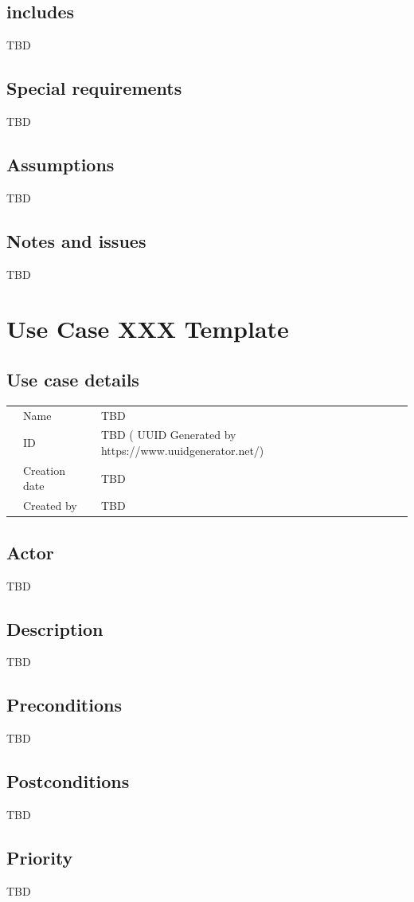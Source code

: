 \documentclass[a4paper]{article}
\begin{document}
\subsection{includes}
TBD
\subsection{Special requirements}
TBD
\subsection{Assumptions}
TBD
\subsection{Notes and issues}
TBD

\section{Use Case XXX Template}
\subsection{Use case details}

\begin{tabular}{lll}
	&Name  & TBD \\
	&ID  & TBD ( UUID Generated by https://www.uuidgenerator.net/) \\
	&Creation date  & TBD \\
	&Created by  & TBD 
\end{tabular}

\subsection{Actor}
TBD
\subsection{Description}
TBD
\subsection{Preconditions}
TBD
\subsection{Postconditions}
TBD
\subsection{Priority}
TBD
\end{document}
